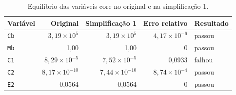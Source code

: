 \begin{table}[htbp]
\centering
\caption{Equilíbrio das variáveis core no original e na simplificação 1.}
\label{tab:simp1-equilibrios}
\begin{tabular}{lrrrl}
\toprule
Variável & Original & Simplificação 1 & Erro relativo & Resultado \\
\midrule
\texttt{Cb} & $3{,}19 \times 10^{5}$ & $3{,}19 \times 10^{5}$ & $4{,}17 \times 10^{-6}$ & passou \\
\texttt{Mb} & 1{,}00 & 1{,}00 & 0 & passou \\
\texttt{C1} & $8{,}29 \times 10^{-5}$ & $7{,}52 \times 10^{-5}$ & 0{,}0933 & falhou \\
\texttt{C2} & $8{,}17 \times 10^{-10}$ & $7{,}44 \times 10^{-10}$ & $8{,}74 \times 10^{-4}$ & passou \\
\texttt{E2} & 0{,}0564 & 0{,}0564 & 0 & passou \\
\bottomrule
\end{tabular}
\end{table}
